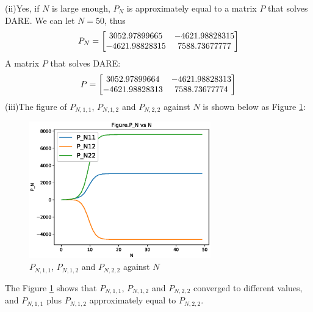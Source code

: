 \documentclass[a4paper,11pt,reqno]{amsart}
\begin{document}
(ii)Yes, if $N$ is large enough, $P_N$ is approximately equal to a matrix $P$ that solves DARE.
We can let $N=50$, thus
\begin{equation}
    P_N =
    \begin{bmatrix}
        3052.97899665 & -4621.98828315 \\
        -4621.98828315 & 7588.73677777
    \end{bmatrix}
    \notag
\end{equation}
A matrix $P$ that solves DARE:
\begin{equation}
    P =
    \begin{bmatrix}
        3052.97899664 & -4621.98828313 \\
        -4621.98828313 & 7588.73677774
    \end{bmatrix}
    \notag
\end{equation}
(iii)The figure of $P_{N,1,1}$, $P_{N,1,2}$ and $P_{N,2,2}$ against $N$ is shown below as Figure \ref{fig:q2_iii}:
\begin{figure}[H]
    \centering
    \includegraphics[width=0.7\textwidth]{figures/q2_iii.eps}
    \caption{$P_{N,1,1}$, $P_{N,1,2}$ and $P_{N,2,2}$ against $N$}
    \label{fig:q2_iii}
\end{figure}
The Figure \ref{fig:q2_iii} shows that $P_{N,1,1}$, $P_{N,1,2}$ and $P_{N,2,2}$ converged to different values, and $P_{N,1,1}$ plus $P_{N,1,2}$ approximately equal to $P_{N,2,2}$.
\\
\end{document}
